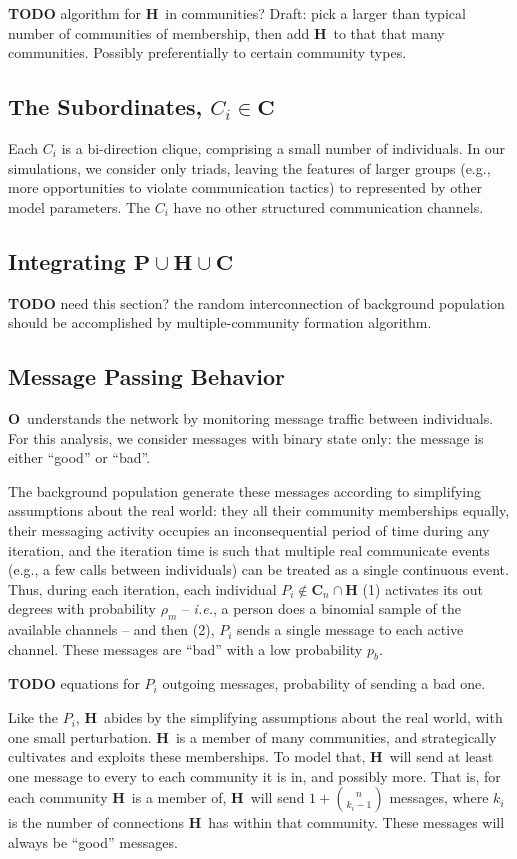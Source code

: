 \documentclass{article}
\newcommand{\Hub}[0]{\ensuremath{\mathbf{H}}}
\newcommand{\C}[1]{\ensuremath{\mathbf{C}_{#1}}}
\newcommand{\Obs}[0]{\ensuremath{\mathbf{O}}}
\begin{document}
{\bf TODO} algorithm for \Hub\ in communities?  Draft: pick a larger than typical number of communities of membership, then add \Hub\ to that that many communities.  Possibly preferentially to certain community types.

\subsection*{The Subordinates, $C_i\in\mathbf{C}$}
Each $C_i$ is a bi-direction clique, comprising a small number of individuals.  In our simulations, we consider only triads, leaving the features of larger groups (e.g., more opportunities to violate communication tactics) to represented by other model parameters.  The $C_i$ have no other structured communication channels.

\subsection*{Integrating $\mathbf{P}\cup\Hub\cup\mathbf{C}$}
{\bf TODO} need this section?  the random interconnection of background population should be accomplished by multiple-community formation algorithm.

\subsection*{Message Passing Behavior}
\Obs\ understands the network by monitoring message traffic between individuals.  For this analysis, we consider messages with binary state only: the message is either ``good'' or ``bad''.

The background population generate these messages according to simplifying assumptions about the real world: they all their community memberships equally, their messaging activity occupies an inconsequential period of time during any iteration, and the iteration time is such that multiple real communicate events (e.g., a few calls between individuals) can be treated as a single continuous event.  Thus, during each iteration, each individual $P_i\notin\C{n}\cap\Hub$ (1) activates its out degrees with probability $\rho_m$ -- {\em i.e.}, a person does a binomial sample of the available channels -- and then (2), $P_i$ sends a single message to each active channel.  These messages are ``bad'' with a low probability $p_b$.

{\bf TODO} equations for $P_i$ outgoing messages, probability of sending a bad one.

Like the $P_i$, \Hub\ abides by the simplifying assumptions about the real world, with one small perturbation.  \Hub\ is a member of many communities, and strategically cultivates and exploits these memberships.  To model that, \Hub\ will send at least one message to every to each community it is in, and possibly more.  That is, for each community \Hub\ is a member of, \Hub\ will send $1+{n\choose k_i-1}$ messages, where $k_i$ is the number of connections \Hub\ has within that community.  These messages will always be ``good'' messages.
\end{document}
